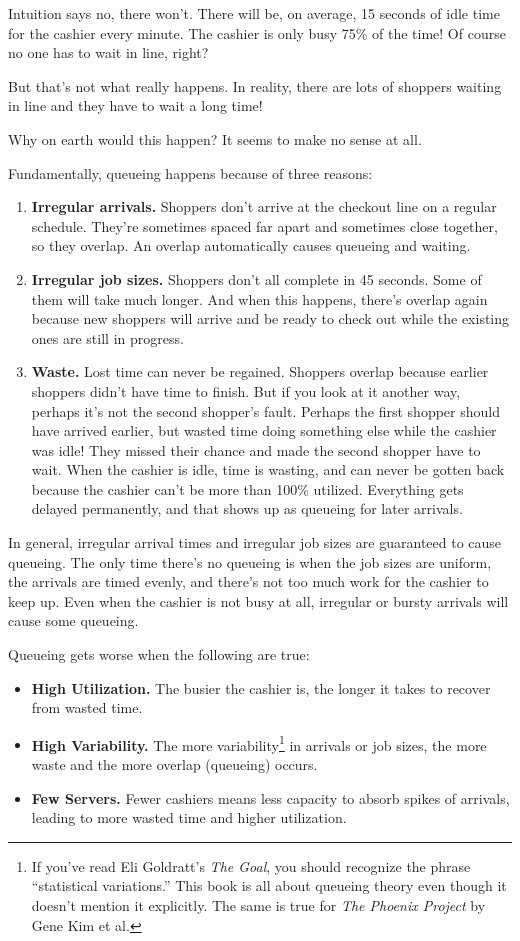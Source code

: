 \documentclass{vivid_layout}
\begin{document}
Intuition says no, there won't. There will be, on average, 15 seconds of idle time for the cashier every minute. The cashier is only busy 75\% of the time! Of course no one has to wait in line, right?

But that's not what really happens. In reality, there are lots of shoppers waiting in line and they have to wait a long time!

Why on earth would this happen? It seems to make no sense at all.

Fundamentally, queueing happens because of three reasons:
\begin{enumerate}	%
\item {\bfseries Irregular arrivals.} Shoppers don't arrive at the checkout line on a regular schedule. They're sometimes spaced far apart and sometimes
close together, so they overlap. An overlap automatically causes
queueing and waiting.
\item {\bfseries Irregular job sizes.} Shoppers don't all complete in 45 seconds.
Some of them will take much longer. And when this happens, there's
overlap again because new shoppers will arrive and be ready to
check out while the existing ones are still in progress.
\item {\bfseries Waste.} Lost time can never be regained. Shoppers overlap because earlier shoppers didn't have time to finish. But if you look at it another way, perhaps it's not the second shopper's fault. Perhaps the first shopper should have arrived earlier, but wasted time doing something else while the cashier was idle! They missed their chance and made the second shopper have to wait. When the cashier is idle, time is wasting, and can never be gotten back because the cashier can't be more than 100\% utilized. Everything gets delayed permanently, and that shows up as queueing for later arrivals.
\end{enumerate}
In general, irregular arrival times and irregular job sizes are guaranteed to cause queueing.  The only time there's no queueing is when the job sizes are uniform, the arrivals are timed evenly, and there's not too much work for the cashier to keep up. Even when the cashier is not busy at all, irregular or bursty arrivals will cause some queueing.

Queueing gets worse when the following are true:

\begin{itemize}
\item {\bfseries High Utilization.} The busier the cashier is, the longer it takes to recover from wasted time.
\item {\bfseries High Variability.} The more variability\footnote{If you've read Eli Goldratt's {\itshape The Goal}, you should recognize the phrase ``statistical variations.'' This book is all about queueing theory even though it doesn't mention it explicitly. The same is true for {\itshape The Phoenix Project} by Gene Kim et al.} in arrivals or job sizes, the more waste and the more overlap (queueing) occurs.
\item {\bfseries Few Servers.} Fewer cashiers means less capacity to absorb spikes of arrivals, leading to more wasted time and higher utilization.
\end{itemize}
\end{document}
